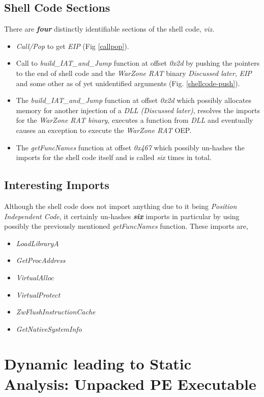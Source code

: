 \documentclass[10pt,a4paper]{article}
\begin{document}
\subsection{Shell Code Sections}
There are \textbf{\textit{four}} distinctly identifiable sections of the shell code, \textit{viz.}
\begin{itemize}
	\item \textit{Call/Pop} to get \textit{EIP} (Fig \ref{callpop}).
	\item Call to \textit{build\_IAT\_and\_Jump} function at offset \textit{0x2d} by pushing the pointers to the end of shell code and the \textit{WarZone RAT} binary \textit{Discussed later}, \textit{EIP} and some other as of yet unidentified arguments (Fig. \ref{shellcode-push}).
	\item The \textit{build\_IAT\_and\_Jump} function at offset \textit{0x2d} which possibly allocates memory for another injection of a \textit{DLL (Discussed later)}, resolves the imports for the \textit{WarZone RAT binary}, executes a function from \textit{DLL} and eventually causes an exception to execute the \textit{WarZone RAT} OEP.
	\item The \textit{getFuncNames} function at offset \textit{0x467} which possibly un-hashes the imports for the shell code itself and is called \textit{six} times in total.
\end{itemize}

\subsection{Interesting Imports}
Although the shell code does not import anything due to it being \textit{Position Independent Code}, it certainly un-hashes \textit{\textbf{six}} imports in particular by using possibly the previously mentioned \textit{getFuncNames} function.
These imports are,
\begin{itemize}
	\item \textit{LoadLibraryA}
	\item \textit{GetProcAddress}
	\item \textit{VirtualAlloc}
	\item \textit{VirtualProtect}
	\item \textit{ZwFlushInstructionCache}
	\item \textit{GetNativeSystemInfo}
\end{itemize}

\section{Dynamic leading to Static Analysis: Unpacked PE Executable}
\end{document}

